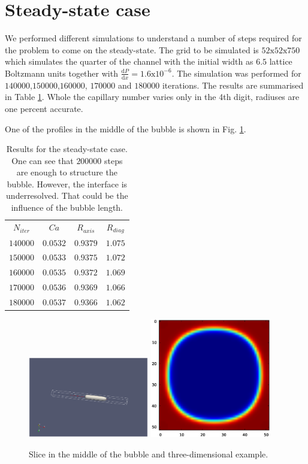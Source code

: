 \documentclass{article}
\begin{document}
\section{Steady-state case}
We performed different simulations to understand a number of steps required for the problem to come
on the steady-state. The grid to be simulated is $52\mathrm{x}52\mathrm{x}750$ which simulates the
quarter of the channel with the initial
width as $6.5$ lattice Boltzmann units together with $\frac{\mathrm{d}P}{\mathrm{d}x}=1.6
\mathrm{x}10^{-6}$. The simulation was performed for $140000$,$150000$,$160000$, $170000$ and
$180000$ iterations. The results are summarised in Table \ref{table:steady:state}. Whole the
capillary number varies only in the 4th digit, radiuses are one percent accurate. 

One of the
profiles in
the middle of the bubble is shown in Fig. \ref{fig:steady:state:profile:example}.
\begin{table}
\begin{tabular}{|c|c|c|c|}
\hline
$N_{iter}$&$Ca$&$R_{axis}$&$R_{diag}$\\
$140000$&$0.0532$&$0.9379$&$1.075$\\
$150000$&$0.0533$&$0.9375$&$1.072$\\
$160000$&$0.0535$&$0.9372$&$1.069$\\
$170000$&$0.0536$&$0.9369$&$1.066$\\
$180000$&$0.0537$&$0.9366$&$1.062$\\
\hline
\end{tabular}
\caption{Results for the steady-state case. One can see that $200000$ steps are enough to structure
the bubble. However, the interface is underresolved. That could be the influence of the bubble
length.\label{table:steady:state}}
\end{table}
\begin{figure}
\includegraphics[width=0.47\textwidth]{Figures/bullet.eps}\hfill
\includegraphics[width=0.47\textwidth]{Figures/example_crossection.eps}\\
\caption{Slice in the middle of the bubble and
three-dimensional example. \label{fig:steady:state:profile:example}}
\end{figure}
\end{document}
